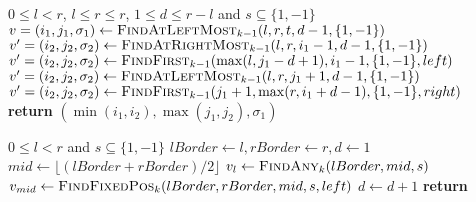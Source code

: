 \begin{appendix}
    \begin{algorithm}[h!]
        \caption{$(l,r,d,t,s)$}\label{alg:falm_k}
        \begin{algorithmic}
            \Require $0 \leq l < r$, $l \leq r \leq r$, $1\leq d \leq r-l$ and $s \subseteq \{1,-1\}$
            \State $v = (i_1,j_1,\sigma_1) \gets \textsc{FindAtLeftMost$_{k-1}$}(l,r,t,d-1,\{1,-1\})$
             {
                \State $v' = (i_2,j_2,\sigma_2) \gets \textsc{FindAtRightMost$_{k-1}$}(l,r,i_1-1,d-1,\{1,-1\})$
                \State $v' = (i_2,j_2,\sigma_2) \gets \textsc{FindFirst$_{k-1}$}(\max(l, j_1-d+1),i_1-1,\{1,-1\}, left)$
                \EndIf
                \EndIf
                \State $v' = (i_2,j_2,\sigma_2) \gets \textsc{FindAtLeftMost$_{k-1}$}(l,r,j_1+1,d-1,\{1,-1\})$
                \EndIf
                \State $v' = (i_2,j_2,\sigma_2) \gets \textsc{FindFirst$_{k-1}$}(j_1+1,\max(r, i_1+d-1),\{1,-1\}, right)$
                \EndIf
                \EndIf
            }
                \EndIf
                \State \textbf{return} $(\min(i_1, i_2), \max(j_1, j_2), \sigma_1)$
            \EndIf

        \end{algorithmic}
    \end{algorithm}

    \begin{algorithm}[h!]
        \caption{$(l, r, s, left)$}
        \begin{algorithmic}
            \Require $0\leq l < r$ and $s \subseteq \{1,-1\}$
            \State $lBorder \gets l, rBorder \gets r, d \gets 1$
            \State $ mid \gets \lfloor (lBorder + rBorder)/2 \rfloor $
            \State $v_l \gets \textsc{FindAny$_{k}$}(lBorder, mid, s)$
            \Else
            \State $v_{mid} \gets \textsc{FindFixedPos$_{k}$}(lBorder, rBorder, mid, s, left)$
            \EndIf
            \EndIf
            \State $d \gets d+1$
            \EndWhile
            \State \textbf{return} \Null
        \end{algorithmic}
    \end{algorithm}



\end{appendix}
